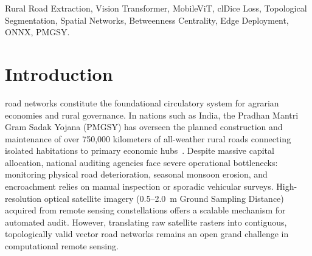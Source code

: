 \documentclass[conference]{IEEEtran}
\begin{document}
\begin{IEEEkeywords}
Rural Road Extraction, Vision Transformer, MobileViT, clDice Loss, Topological Segmentation, Spatial Networks, Betweenness Centrality, Edge Deployment, ONNX, PMGSY.
\end{IEEEkeywords}

\section{Introduction}
\label{sec:introduction}

 road networks constitute the foundational circulatory system for agrarian economies and rural governance. In nations such as India, the Pradhan Mantri Gram Sadak Yojana (PMGSY) has overseen the planned construction and maintenance of over 750,000 kilometers of all-weather rural roads connecting isolated habitations to primary economic hubs~\cite{pmgsy2023}. Despite massive capital allocation, national auditing agencies face severe operational bottlenecks: monitoring physical road deterioration, seasonal monsoon erosion, and encroachment relies on manual inspection or sporadic vehicular surveys. High-resolution optical satellite imagery (0.5--2.0~m Ground Sampling Distance) acquired from remote sensing constellations offers a scalable mechanism for automated audit. However, translating raw satellite rasters into contiguous, topologically valid vector road networks remains an open grand challenge in computational remote sensing.
\end{document}
